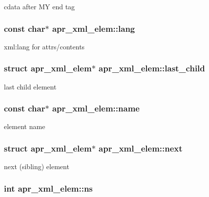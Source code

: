 cdata after M\-Y end tag \hypertarget{structapr__xml__elem_a9a48a384f579816f62a7369aeb8b1a0c}{
\subsubsection[{lang}]{\setlength{\rightskip}{0pt plus 5cm}const char$\ast$ apr\-\_\-xml\-\_\-elem\-::lang}}\label{structapr__xml__elem_a9a48a384f579816f62a7369aeb8b1a0c}
xml\-:lang for attrs/contents \hypertarget{structapr__xml__elem_ad4f49811fc36f2377c72ac2c19e57abd}{
\subsubsection[{last\-\_\-child}]{\setlength{\rightskip}{0pt plus 5cm}struct {\bf apr\-\_\-xml\-\_\-elem}$\ast$ apr\-\_\-xml\-\_\-elem\-::last\-\_\-child}}\label{structapr__xml__elem_ad4f49811fc36f2377c72ac2c19e57abd}
last child element \hypertarget{structapr__xml__elem_a5b2fb684a9cfb244f88ad88f539fe3d6}{
\subsubsection[{name}]{\setlength{\rightskip}{0pt plus 5cm}const char$\ast$ apr\-\_\-xml\-\_\-elem\-::name}}\label{structapr__xml__elem_a5b2fb684a9cfb244f88ad88f539fe3d6}
element name \hypertarget{structapr__xml__elem_a8687253d504b1c1363c47117611042ac}{
\subsubsection[{next}]{\setlength{\rightskip}{0pt plus 5cm}struct {\bf apr\-\_\-xml\-\_\-elem}$\ast$ apr\-\_\-xml\-\_\-elem\-::next}}\label{structapr__xml__elem_a8687253d504b1c1363c47117611042ac}
next (sibling) element \hypertarget{structapr__xml__elem_a613ea31964572df7b41f5a9da8d0982e}{
\subsubsection[{ns}]{\setlength{\rightskip}{0pt plus 5cm}int apr\-\_\-xml\-\_\-elem\-::ns}}\label{structapr__xml__elem_a613ea31964572df7b41f5a9da8d0982e}
